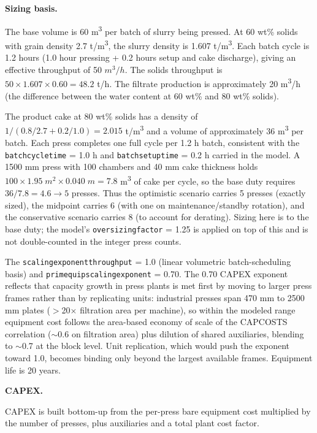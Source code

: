 \documentclass{article}
\renewcommand\_{\textunderscore\allowbreak}
\begin{document}
\medskip
\noindent\textbf{Sizing basis.}\quad

The base volume is 60 \si{m^3} per batch of slurry being pressed. At 60 wt\% solids with grain density 2.7 \si{t/m^3}, the slurry density is 1.607 \si{t/m^3}. Each batch cycle is 1.2 hours (1.0 hour pressing + 0.2 hours setup and cake discharge), giving an effective throughput of 50 $\si{m^3/h}$. The solids throughput is $50 \times 1.607 \times 0.60 = 48.2$ t/h. The filtrate production is approximately 20 \si{m^3/h} (the difference between the water content at 60 wt\% and 80 wt\% solids).

The product cake at 80 wt\% solids has a density of $1/(0.8/2.7 + 0.2/1.0) = 2.015$ \si{t/m^3} and a volume of approximately 36 \si{m^3} per batch. Each press completes one full cycle per 1.2 h batch, consistent with the \texttt{batch\_cycle\_time} = 1.0 h and \texttt{batch\_setup\_time} = 0.2 h carried in the model. A 1500 mm press with 100 chambers and 40 mm cake thickness holds $100 \times 1.95\;\si{m^2} \times 0.040\;\si{m} = 7.8$ \si{m^3} of cake per cycle, so the base duty requires $36 / 7.8 = 4.6 \rightarrow 5$ presses. Thus the optimistic scenario carries 5 presses (exactly sized), the midpoint carries 6 (with one on maintenance/standby rotation), and the conservative scenario carries 8 (to account for derating). Sizing here is to the base duty; the model's \texttt{oversizing\_factor} = 1.25 is applied on top of this and is not double-counted in the integer press counts.

The \texttt{scaling\_exponent\_throughput} = 1.0 (linear volumetric batch-scheduling basis) and \texttt{prim\_equip\_scaling\_exponent} = 0.70. The 0.70 CAPEX exponent reflects that capacity growth in press plants is met first by moving to larger press frames rather than by replicating units: industrial presses span 470 mm to 2500 mm plates ($>$20$\times$ filtration area per machine), so within the modeled range equipment cost follows the area-based economy of scale of the CAPCOSTS correlation ($\sim$0.6 on filtration area) plus dilution of shared auxiliaries, blending to $\sim$0.7 at the block level. Unit replication, which would push the exponent toward 1.0, becomes binding only beyond the largest available frames. Equipment life is 20 years.

\medskip
\noindent\textbf{CAPEX.}\quad

CAPEX is built bottom-up from the per-press bare equipment cost multiplied by the number of presses, plus auxiliaries and a total plant cost factor.
\end{document}
